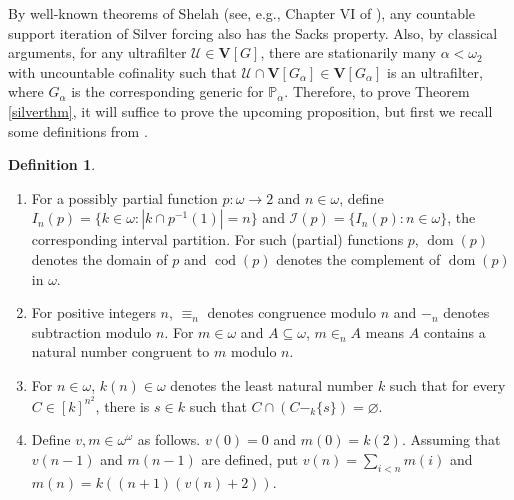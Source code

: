 \documentclass[12pt]{article}
\theoremstyle{definition}
\newtheorem{defi}[nummer]{\sc Definition}
\newcommand\dom{\operatorname{dom}}
\begin{document}
By well-known theorems of Shelah (see, e.g., Chapter VI of \cite{she}), any countable support iteration of Silver forcing also has the Sacks property. Also, by classical arguments, for any ultrafilter $\mathcal{U}\in \mathbf{V}[G]$, there are stationarily many $\alpha<\omega_2$ with uncountable cofinality such that $\mathcal{U}\cap \mathbf{V}[G_{\alpha}]\in \mathbf{V}[G_{\alpha}]$ is an ultrafilter, where $G_{\alpha}$ is the corresponding generic for $\mathbb{P}_{\alpha}$. Therefore, to prove Theorem \ref{silverthm}, it will suffice to prove the upcoming proposition, but first we recall some definitions from \cite{chodguz-ppoints}.
\begin{defi}
\begin{enumerate}[label=(\roman*)]
\item For a possibly partial function $p:\omega \to 2$ and $n\in\omega$, define $I_n(p)=\{k\in\omega : |k\cap p^{-1}(1)|=n\}$ and $\mathcal{I}(p)=\{I_n(p) : n\in\omega\}$, the corresponding interval partition. For such (partial) functions $p$, $\dom(p)$ denotes the domain of $p$ and $\operatorname{cod}(p)$ denotes the complement of $\dom(p)$ in $\omega$.
\item For positive integers $n$, $\equiv_n$ denotes congruence modulo $n$ and $-_n$ denotes subtraction modulo $n$. For $m\in\omega$ and $A\subseteq \omega$, $m\in_n A$ means $A$ contains a natural number congruent to $m$ modulo $n$.
\item For $n\in\omega$, $k(n)\in\omega$ denotes the least natural number $k$ such that for every $C\in[k]^{n^2}$, there is $s\in k$ such that $C\cap (C-_{k} \{s\})=\varnothing$.
\item Define $v,m\in\omega^\omega$ as follows. $v(0)=0$ and $m(0)=k(2)$. Assuming that $v(n-1)$ and $m(n-1)$ are defined, put $v(n)=\sum_{i<n} m(i)$ and $m(n)=k((n+1)(v(n)+2))$.
\end{enumerate}
\end{defi}
\end{document}
